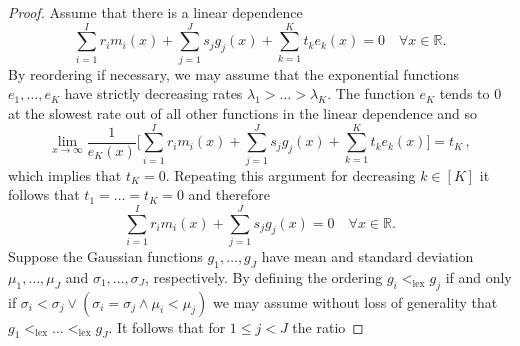 \documentclass[a4paper,UKenglish,cleveref, autoref,mathscr]{lipics-v2019}
\newcommand{\RR}{\mathbb{R}}
\newcommand{\1}{\mathbbm{1}}
\begin{document}
\begin{proof}
	Assume that there is a linear dependence\begin{equation*}
	\sum_{i = 1}^{I} r_i m_i(x) + \sum_{j = 1}^J s_j g_j(x) + \sum_{k = 1}^K t_k e_k(x) = 0 \quad \forall x \in \RR.
	\end{equation*}
	By reordering if necessary, we may assume that the exponential functions $e_1, \dots, e_K$ have strictly decreasing rates $\lambda_1 > \dots > \lambda_K$. The function $e_K$ tends to $0$ at the slowest rate out of all other functions in the linear dependence and so
	\begin{equation*}
	\lim_{x \rightarrow \infty}  \frac{1}{e_K(x)}\Big[\sum_{i = 1}^{I} r_i m_i(x) + \sum_{j = 1}^J s_j g_j(x) + \sum_{k = 1}^K t_k e_k(x)\Big] = t_K\,,
	\end{equation*}
	which implies that $t_K = 0$. Repeating this argument for decreasing $k \in [K]$ it follows that $t_1 = \dots = t_K = 0$ and therefore
	\begin{equation*}
	\sum_{i = 1}^{I} r_i m_i(x) + \sum_{j = 1}^J s_j g_j(x) = 0 \quad \forall x \in \RR.
	\end{equation*}
	Suppose the Gaussian functions $g_1, \dots, g_J$ have mean and standard deviation $\mu_1, \dots, \mu_J$ and $\sigma_1, \dots, \sigma_J$, respectively. By defining the ordering $g_i <_{\text{lex}} g_j$ if and only if $\sigma_i < \sigma_j \lor (\sigma_i = \sigma_j \land \mu_i < \mu_j)$ we may assume without loss of generality that $g_1 <_{\text{lex}} \dots <_{\text{lex}} g_J$. It follows that for $1 \leq j < J$ the ratio
	

\end{proof}
\end{document}
